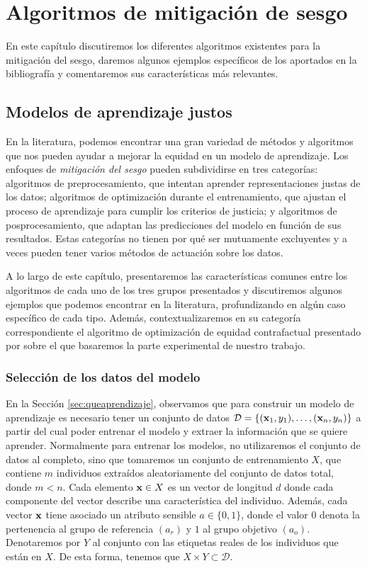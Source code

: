 \documentclass[oneside,openright,titlepage,numbers=noenddot,openany,headinclude,footinclude=true,
cleardoublepage=empty,abstractoff,BCOR=5mm,paper=a4,fontsize=12pt,main=spanish]{scrreprt}
\begin{document}
\chapter{Algoritmos de mitigación de sesgo} \label{ch:algmitigar}

En este capítulo discutiremos los diferentes algoritmos existentes para la mitigación del sesgo, daremos algunos ejemplos específicos de los aportados en la bibliografía y comentaremos sus características más relevantes.

\section{Modelos de aprendizaje justos}

En la literatura, podemos encontrar una gran variedad de métodos y algoritmos que nos pueden ayudar a mejorar la equidad en un modelo de aprendizaje. Los enfoques de \textit{mitigación del sesgo} pueden subdividirse en tres categorías: algoritmos de preprocesamiento, que intentan aprender representaciones justas de los datos; algoritmos de optimización durante el entrenamiento, que ajustan el proceso de aprendizaje para cumplir los criterios de justicia; y algoritmos de posprocesamiento, que adaptan las predicciones del modelo en función de sus resultados. Estas categorías no tienen por qué ser mutuamente excluyentes y a veces pueden tener varios métodos de actuación sobre los datos.

A lo largo de este capítulo, presentaremos las características comunes entre los algoritmos de cada uno de los tres grupos presentados y discutiremos algunos ejemplos que podemos encontrar en la literatura, profundizando en algún caso específico de cada tipo. Además, contextualizaremos en su categoría correspondiente el algoritmo de optimización de equidad contrafactual presentado por \cite{counterfactual2018} sobre el que basaremos la parte experimental de nuestro trabajo.

\subsection{Selección de los datos del modelo}

En la Sección \ref{sec:queaprendizaje}, observamos que para construir un modelo de aprendizaje es necesario tener un conjunto de datos $\mathcal{D}=\{(\textbf{x}_1,y_1),\dots,(\textbf{x}_n,y_n)\}$ a partir del cual poder entrenar el modelo y extraer la información que se quiere aprender. Normalmente para entrenar los modelos, no utilizaremos el conjunto de datos al completo, sino que tomaremos un conjunto de entrenamiento $X$, que contiene $m$  individuos extraídos aleatoriamente del conjunto de datos total, donde $m < n$. Cada elemento $\textbf{x} \in X$ es un vector de longitud $d$ donde cada componente del vector describe una característica del individuo. Además, cada vector $\textbf{x}$ tiene asociado un atributo sensible $a\in \{0,1\}$, donde el valor $0$ denota la pertenencia al grupo de referencia $(a_r)$ y $1$ al grupo objetivo $(a_o)$. Denotaremos por $Y$ al conjunto con las etiquetas reales de los individuos que están en $X$. De esta forma, tenemos que $X \times Y \subset \mathcal{D}$. 
\end{document}
